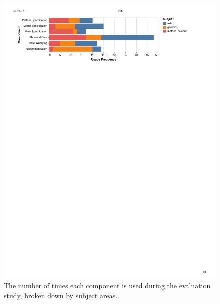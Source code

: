 \begin{figure}[h!]
  \includegraphics[width=\linewidth]{figures/usagefreqbysubject.pdf}
  \caption{The number of times each component is used during the evaluation study, broken down by subject areas.}\label{fig:usagefreqbysubject}
\end{figure}
